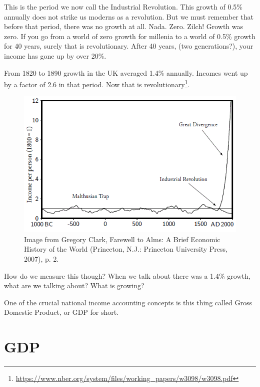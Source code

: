 \documentclass[
]{book}
\begin{document}
This is the period we now call the Industrial Revolution. This growth of 0.5\% annually does not strike us moderns as a revolution. But we must remember that before that period, there was no growth at all. Nada. Zero. Zilch! Growth was zero. If you go from a world of zero growth for millenia to a world of 0.5\% growth for 40 years, surely that is revolutionary. After 40 years, (two generations?), your income has gone up by over 20\%.

From 1820 to 1890 growth in the UK averaged 1.4\% annually. Incomes went up by a factor of 2.6 in that period. Now that is revolutionary\footnote{\url{https://www.nber.org/system/files/working_papers/w3098/w3098.pdf}}.

\begin{figure}

{\centering \includegraphics[width=1\linewidth]{img/growth/fig2} 

}

\caption{Image from Gregory Clark, Farewell to Alms: A Brief Economic History of the World (Princeton, N.J.: Princeton University Press, 2007), p. 2.}\label{fig:growth02}
\end{figure}

How do we measure this though? When we talk about there was a 1.4\% growth, what are we talking about? What is growing?

One of the crucial national income accounting concepts is this thing called Gross Domestic Product, or GDP for short.

\hypertarget{gdp}{%
\section{GDP}\label{gdp}}
\end{document}

